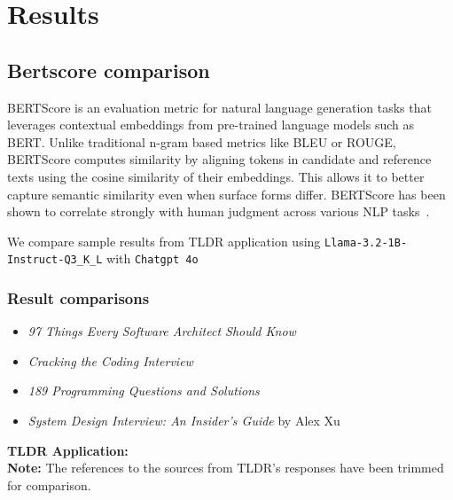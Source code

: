 
\chapter{Results}
\label{ch:Results}



\section{Bertscore comparison}
\label{BertscoreComparison}

BERTScore is an evaluation metric for natural language generation tasks that leverages contextual embeddings from pre-trained language models such as BERT. Unlike traditional n-gram based metrics like BLEU or ROUGE, BERTScore computes similarity by aligning tokens in candidate and reference texts using the cosine similarity of their embeddings. This allows it to better capture semantic similarity even when surface forms differ. BERTScore has been shown to correlate strongly with human judgment across various NLP tasks~\cite{zhang2020bertscore}.


We compare sample results from TLDR application using \texttt{Llama-3.2-1B-Instruct-Q3\_K\_L} with \texttt{Chatgpt 4o}

\subsection{Result comparisons}
\label{subsec:Result comparisons}
\begin{itemize}
    \item \textit{97 Things Every Software Architect Should Know}
    \item \textit{Cracking the Coding Interview}
    \item \textit{189 Programming Questions and Solutions}
    \item \textit{System Design Interview: An Insider’s Guide} by Alex Xu
\end{itemize}

\textbf{TLDR Application:}
\\ \textbf{Note:} The references to the sources from TLDR's responses have been trimmed for comparison.

